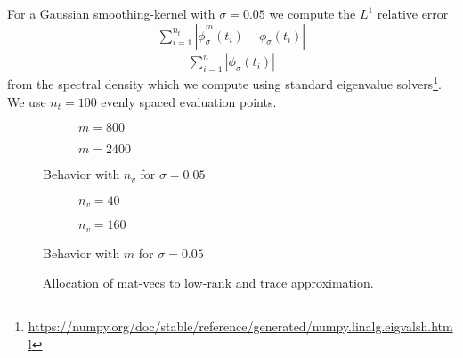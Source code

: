 For a Gaussian \gls{smoothing-kernel} 
with $\sigma=0.05$ we compute the $L^1$ relative error
\begin{equation}
    \frac{\sum_{i=1}^{n_t} |\widetilde{\phi}_{\sigma}^m(t_i) - \phi_{\sigma}(t_i)|}{\sum_{i=1}^n |\phi_{\sigma}(t_i)|}
    \label{equ:5-experiments-L1-error}
\end{equation}
from the spectral density which we compute using standard eigenvalue solvers\footnote{\url{https://numpy.org/doc/stable/reference/generated/numpy.linalg.eigvalsh.html}}.
We use $n_t=100$ evenly spaced evaluation points.

\clearpage
\begin{figure}[ht]
    \begin{subfigure}[b]{0.45\columnwidth}
        
        \caption{$m=800$}
        \label{fig:5-experiments-electronic-structure-convergence-nv-m800}
    \end{subfigure}
    \begin{subfigure}[b]{0.5\columnwidth}
        
        \caption{$m=2400$}
        \label{fig:5-experiments-electronic-structure-convergence-nv-m2400}
    \end{subfigure}
    \caption{Behavior with $n_v$ for $\sigma=0.05$}
    \label{fig:5-experiments-electronic-structure-convergence-nv}
\end{figure}

\begin{figure}[ht]
    \centering
    \begin{subfigure}[b]{0.45\columnwidth}
        
        \caption{$n_v=40$}
        \label{fig:5-experiments-electronic-structure-convergence-m-nv40}
    \end{subfigure}
    \begin{subfigure}[b]{0.5\columnwidth}
        
        \caption{$n_v=160$}
        \label{fig:5-experiments-electronic-structure-convergence-m-nv160}
    \end{subfigure}
    \caption{Behavior with $m$ for $\sigma=0.05$}
    \label{fig:5-experiments-electronic-structure-convergence-m}
\end{figure}

\begin{figure}[ht]
    \centering
    
    \caption{Allocation of mat-vecs to low-rank and trace approximation.}
    \label{fig:5-experiments-electronic-structure-matvec-mixture}
\end{figure}

